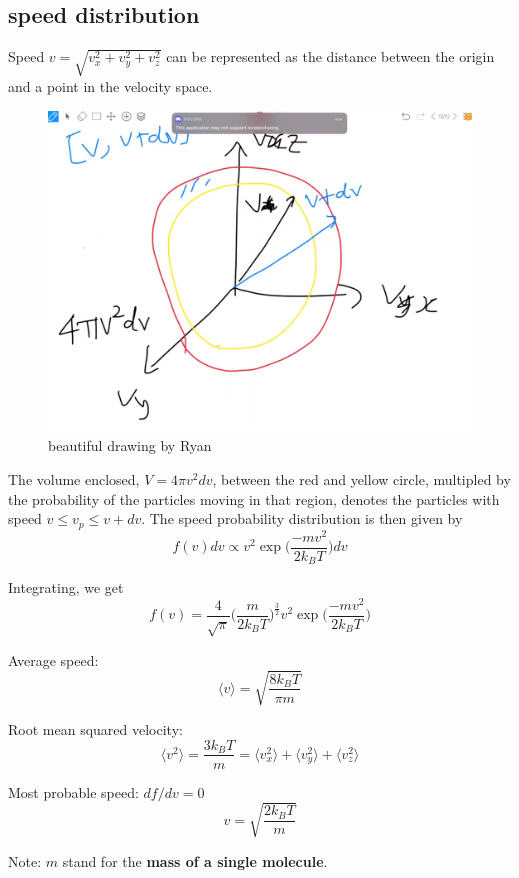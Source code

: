\subsection{speed distribution}
Speed $v=\sqrt{v_x^2+v_y^2+v_z^2}$ can be represented as the distance between the origin and a point in the velocity space.
\begin{figure}[H]
    \centering
    \includegraphics[width=0.5\linewidth]{velocity space.png}
    \caption{beautiful drawing by Ryan}
    \label{<label>}
\end{figure}
The volume enclosed, $V=4\pi v^2 dv$, between the red and yellow circle, multipled by the probability of the particles moving in that region, denotes the particles with speed $v \leq v_p \leq v+dv$. The speed probability distribution is then given by
\begin{equation}
    f(v)dv\propto v^2 \exp \bigg({\frac{-mv^2}{2k_B T}}\bigg)dv
\end{equation}

Integrating, we get
\begin{equation}
    f(v)=\frac{4}{\sqrt{\pi}}\bigg(\frac{m}{2 k_B T}\bigg)^\frac{3}{2} v^2 \exp\bigg({\frac{-mv^2}{2k_BT}}\bigg)
\end{equation}

Average speed:
\begin{equation}
    \langle v \rangle =\sqrt{\frac{8k_BT}{\pi m}}
\end{equation}

Root mean squared velocity: 
\begin{equation}
    \langle v^2 \rangle =\frac{3k_BT}{m} = \langle v_x^2\rangle + \langle v_y^2\rangle + \langle v_z^2\rangle
\end{equation}

Most probable speed: $df/dv=0$
\begin{equation} 
    v=\sqrt{\frac{2k_BT}{m}}
\end{equation}

Note: $m$ stand for the \textbf{mass of a single molecule}.

